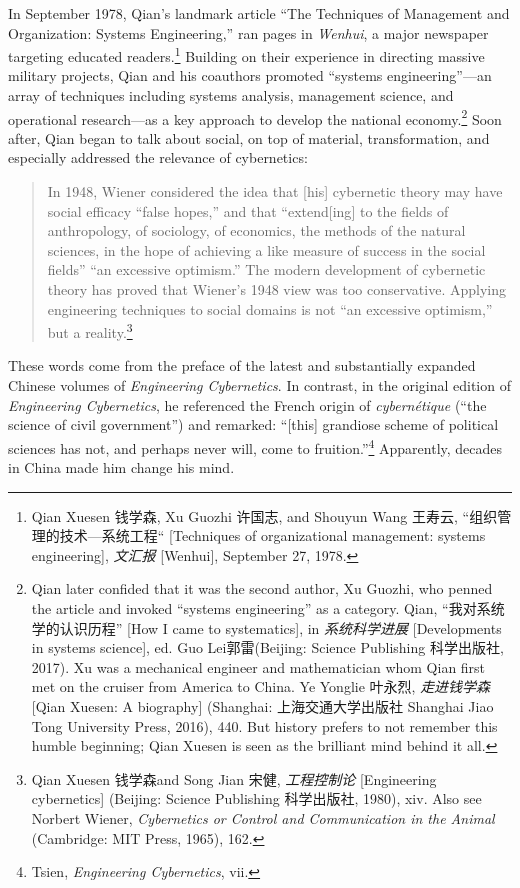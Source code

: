 \documentclass{tufte-handout}
\begin{document}
\begin{CJK*}{UTF8}{gbsn}
In September 1978, Qian's landmark article ``The Techniques of
Management and Organization: Systems Engineering,'' ran pages in
\emph{Wenhui}, a major newspaper targeting educated readers.\footnote{Qian
  Xuesen 钱学森, Xu Guozhi 许国志, and Shouyun Wang 王寿云,
  ``组织管理的技术---系统工程`` {[}Techniques of organizational
  management: systems engineering{]}, \emph{文汇报} {[}Wenhui{]},
  September 27, 1978.} Building on their experience in directing massive
military projects, Qian and his coauthors promoted ``systems
engineering''---an array of techniques including systems analysis,
management science, and operational research---as a key approach to
develop the national economy.\footnote{Qian later confided that it was
  the second author, Xu Guozhi, who penned the article and invoked
  ``systems engineering'' as a category. Qian, ``我对系统学的认识历程''
  {[}How I came to systematics{]}, in \emph{系统科学进展}
  {[}Developments in systems science{]}, ed. Guo Lei郭雷(Beijing:
  Science Publishing 科学出版社, 2017). Xu was a mechanical engineer and
  mathematician whom Qian first met on the cruiser from America to
  China. Ye Yonglie 叶永烈, \emph{走进钱学森} {[}Qian Xuesen: A
  biography{]} (Shanghai: 上海交通大学出版社 Shanghai Jiao Tong
  University Press, 2016), 440. But history prefers to not remember this
  humble beginning; Qian Xuesen is seen as the brilliant mind behind it
  all.} Soon after, Qian began to talk about social, on top of material,
transformation, and especially addressed the relevance of cybernetics:

\begin{quote}
In 1948, Wiener considered the idea that {[}his{]} cybernetic theory may
have social efficacy ``false hopes,'' and that ``extend{[}ing{]} to the
fields of anthropology, of sociology, of economics, the methods of the
natural sciences, in the hope of achieving a like measure of success in
the social fields'' ``an excessive optimism.'' The modern development of
cybernetic theory has proved that Wiener's 1948 view was too
conservative. Applying engineering techniques to social domains is not
``an excessive optimism,'' but a reality.\footnote{Qian Xuesen 钱学森and
  Song Jian 宋健, \emph{工程控制论} {[}Engineering cybernetics{]}
  (Beijing: Science Publishing 科学出版社, 1980), xiv. Also see Norbert
  Wiener, \emph{Cybernetics or Control and Communication in the Animal}
  (Cambridge: MIT Press, 1965), 162.}
\end{quote}

\noindent These words come from the preface of the latest and substantially
expanded Chinese volumes of \emph{Engineering Cybernetics}. In contrast,
in the original edition of \emph{Engineering Cybernetics}, he referenced
the French origin of \emph{cybernétique} (``the science of civil
government'') and remarked: ``{[}this{]} grandiose scheme of political
sciences has not, and perhaps never will, come to fruition.''\footnote{Tsien,
  \emph{Engineering Cybernetics}, vii.} Apparently, decades in China
made him change his mind.


\end{CJK*}
\end{document}
